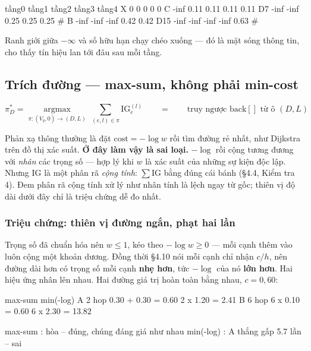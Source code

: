 \documentclass[11pt,a4paper]{article}
\begin{document}
\begin{dia}
          tầng0   tầng1   tầng2   tầng3   tầng4
  X         0       0       0       0       0
  C       -inf    0.11    0.11    0.11    0.11
  D7      -inf    -inf    0.25    0.25    0.25   #
  B       -inf    -inf    -inf    0.42    0.42
  D15     -inf    -inf    -inf    -inf    0.63   #
\end{dia}

Ranh giới giữa $-\infty$ và số hữu hạn chạy chéo xuống --- đó là mặt sóng thông tin, cho thấy tín hiệu lan tới đâu sau mỗi tầng.

\subsection{Trích đường --- max-sum, không phải min-cost}\label{sec:maxsum}

\[ \pi^*_D=\operatorname*{argmax}_{\pi:(V_q,0)\to(D,L)}\ \sum_{(e,l)\in\pi}\mathrm{IG}_e^{(l)}
   \qquad=\qquad \text{truy ngược } \mathrm{back}[] \text{ từ ô } (D,L) \]

Phản xạ thông thường là đặt $\mathrm{cost}=-\log w$ rồi tìm đường rẻ nhất, như Dijkstra trên
đồ thị xác suất. \textbf{Ở đây làm vậy là sai loại.} $-\log$ rồi cộng tương đương với
\emph{nhân} các trọng số --- hợp lý khi $w$ là xác suất của những sự kiện độc lập. Nhưng IG
là một phân rã \emph{cộng tính}: $\sum\mathrm{IG}$ bằng đúng cái bánh (\S4.4, Kiểm tra 4).
Đem phân rã cộng tính xử lý như nhân tính là lệch ngay từ gốc; thiên vị độ dài dưới đây chỉ
là triệu chứng dễ đo nhất.

\subsubsection*{Triệu chứng: thiên vị đường ngắn, phạt hai lần}

Trọng số đã chuẩn hóa nên $w\le 1$, kéo theo $-\log w\ge 0$ --- mỗi cạnh thêm vào luôn cộng
một khoản dương. Đồng thời \S4.10 nói mỗi cạnh chỉ nhận $c/h$, nên đường dài hơn có trọng số
mỗi cạnh \textbf{nhẹ hơn}, tức $-\log$ của nó \textbf{lớn hơn}. Hai hiệu ứng nhân lên nhau.
Hai đường giá trị hoàn toàn bằng nhau, $c=0{,}60$:

\begin{dia}
                      max-sum                       min(-log)
A   2 hop    0.30 + 0.30         = 0.60      2 x 1.20  =   2.41
B   6 hop    6 x 0.10            = 0.60      6 x 2.30  =  13.82

max-sum    : hòa -- đúng, chúng đáng giá như nhau
min(-log)  : A thắng gấp 5.7 lần -- sai
\end{dia}
\end{document}

